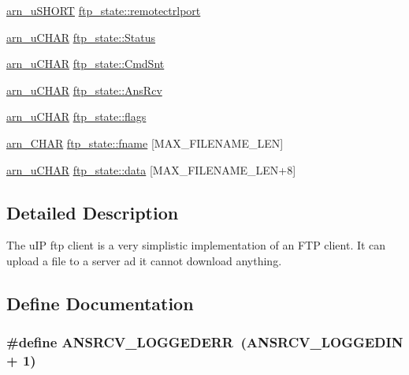 \begin{DoxyCompactItemize}
\item 
\hyperlink{group__ftp_gaa290e3b930f0eff7f256b787fdbe02dc}{arn\_\-uSHORT} \hyperlink{group__ftp_gad9ad023f58a17a9adc147882890aa84c}{ftp\_\-state::remotectrlport}
\item 
\hyperlink{group__ftp_ga748121386e994966f8a87f4160f055b4}{arn\_\-uCHAR} \hyperlink{group__ftp_gaaa4d97116ea038c00c8909bffd58129f}{ftp\_\-state::Status}
\item 
\hyperlink{group__ftp_ga748121386e994966f8a87f4160f055b4}{arn\_\-uCHAR} \hyperlink{group__ftp_ga44d3b63ea7baa07d6743e145f06d2589}{ftp\_\-state::CmdSnt}
\item 
\hyperlink{group__ftp_ga748121386e994966f8a87f4160f055b4}{arn\_\-uCHAR} \hyperlink{group__ftp_ga4308157292a9948553f531a8b4f78c67}{ftp\_\-state::AnsRcv}
\item 
\hyperlink{group__ftp_ga748121386e994966f8a87f4160f055b4}{arn\_\-uCHAR} \hyperlink{group__ftp_ga86be9ef59e2087fdbfdb4886f5289e5c}{ftp\_\-state::flags}
\item 
\hyperlink{group__ftp_gab7c92ee10c15b851350edb8a4a3bb708}{arn\_\-CHAR} \hyperlink{group__ftp_gadc6947ba105e712aad11b7c35604d89c}{ftp\_\-state::fname} \mbox{[}MAX\_\-FILENAME\_\-LEN\mbox{]}
\item 
\hyperlink{group__ftp_ga748121386e994966f8a87f4160f055b4}{arn\_\-uCHAR} \hyperlink{group__ftp_ga3b5f7f0b0f4175c56c7107cfdb51d1ea}{ftp\_\-state::data} \mbox{[}MAX\_\-FILENAME\_\-LEN+8\mbox{]}
\end{DoxyCompactItemize}


\subsection{Detailed Description}
The uIP ftp client is a very simplistic implementation of an FTP client. It can upload a file to a server ad it cannot download anything. 

\subsection{Define Documentation}
\hypertarget{group__ftp_gaadb31db9b1610a09c7500c7158f6ac43}{
\subsubsection[{ANSRCV\_\-LOGGEDERR}]{\setlength{\rightskip}{0pt plus 5cm}\#define ANSRCV\_\-LOGGEDERR~(ANSRCV\_\-LOGGEDIN + 1)}}
\label{group__ftp_gaadb31db9b1610a09c7500c7158f6ac43}


